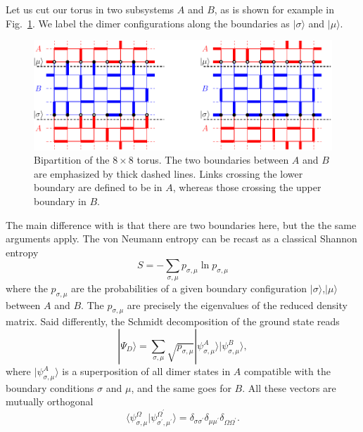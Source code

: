 \documentclass[11pt]{iopart}
\newcommand{\psm}{p_{\sigma,\mu}}
\begin{document}
Let us cut our torus in two subsystems $A$ and $B$, as is shown for example in Fig.~\ref{fig:bipartition}. We label the dimer configurations along the boundaries as $|\sigma\rangle$ and $|\mu\rangle$.
\begin{figure}[ht]
\begin{center}
\includegraphics[scale=0.8]{./figures/bipartition.pdf}
\end{center}
\caption{Bipartition of the $8\times 8$ torus. The two boundaries between $A$ and $B$ are emphasized by thick dashed lines. Links crossing the lower boundary are defined to be in $A$, whereas those crossing the upper boundary in $B$.}
\label{fig:bipartition}
\end{figure}
The main difference with \cite{Shannonee} is that there are two boundaries here, but the the same arguments apply. The von Neumann entropy can be recast as a classical Shannon entropy
\begin{equation}
 S=-\sum_{\sigma,\mu} p_{\sigma,\mu} \ln p_{\sigma,\mu}
\end{equation}
where the $p_{\sigma,\mu}$ are the probabilities of a given boundary configuration $|\sigma\rangle$,$|\mu\rangle$ between $A$ and $B$. 
\label{sec:lg.}
The $\psm$ are precisely the eigenvalues of the reduced density matrix. Said differently, the Schmidt decomposition of the ground state reads
\begin{equation}\label{eq:schmidt}
|\Psi_D\rangle=\sum_{
\sigma,\mu} \sqrt{p_{\sigma,\mu}}|\psi_{\sigma,\mu}^A\rangle |\psi_{\sigma,\mu}^B\rangle,
\end{equation}
where $|\psi_{\sigma,\mu}^A\rangle$ is a superposition of all dimer states in $A$ compatible with the boundary conditions $\sigma$ and $\mu$, and the same goes for $B$. All these vectors are mutually orthogonal
\begin{equation}\label{eq:schmidt_orthogonality}
\langle \psi_{\sigma,\mu}^\Omega|\psi_{\sigma^\prime,\mu^\prime}^{\Omega^\prime}\rangle=\delta_{\sigma \sigma^\prime}\delta_{\mu \mu^\prime}\delta_{\Omega \Omega^\prime}.
\end{equation}
\end{document}
